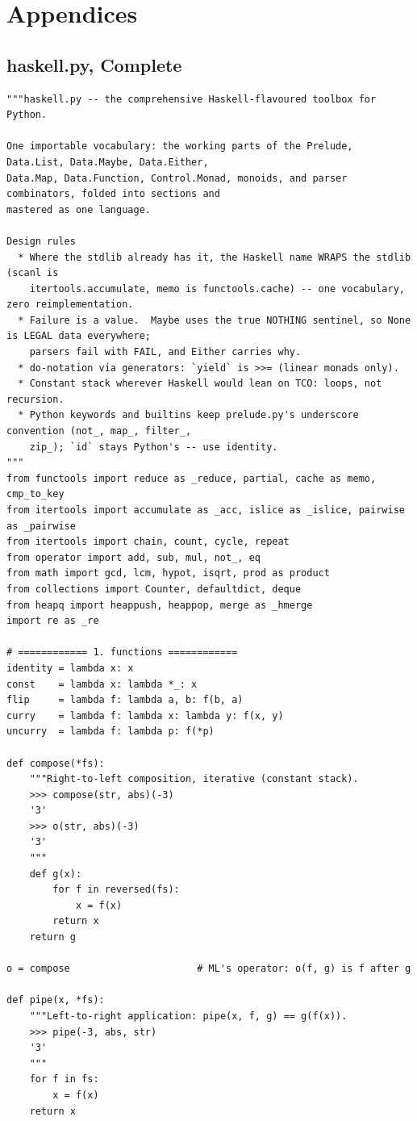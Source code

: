 \documentclass[10pt,letterpaper]{book}
\begin{document}
\part{Appendices}
\chapter{haskell.py, Complete}
\begin{lstlisting}[style=file]
"""haskell.py -- the comprehensive Haskell-flavoured toolbox for Python.

One importable vocabulary: the working parts of the Prelude, Data.List, Data.Maybe, Data.Either,
Data.Map, Data.Function, Control.Monad, monoids, and parser combinators, folded into sections and
mastered as one language.

Design rules
  * Where the stdlib already has it, the Haskell name WRAPS the stdlib (scanl is
    itertools.accumulate, memo is functools.cache) -- one vocabulary, zero reimplementation.
  * Failure is a value.  Maybe uses the true NOTHING sentinel, so None is LEGAL data everywhere;
    parsers fail with FAIL, and Either carries why.
  * do-notation via generators: `yield` is >>= (linear monads only).
  * Constant stack wherever Haskell would lean on TCO: loops, not recursion.
  * Python keywords and builtins keep prelude.py's underscore convention (not_, map_, filter_,
    zip_); `id` stays Python's -- use identity.
"""
from functools import reduce as _reduce, partial, cache as memo, cmp_to_key
from itertools import accumulate as _acc, islice as _islice, pairwise as _pairwise
from itertools import chain, count, cycle, repeat
from operator import add, sub, mul, not_, eq
from math import gcd, lcm, hypot, isqrt, prod as product
from collections import Counter, defaultdict, deque
from heapq import heappush, heappop, merge as _hmerge
import re as _re

# ============ 1. functions ============
identity = lambda x: x
const    = lambda x: lambda *_: x
flip     = lambda f: lambda a, b: f(b, a)
curry    = lambda f: lambda x: lambda y: f(x, y)
uncurry  = lambda f: lambda p: f(*p)

def compose(*fs):
    """Right-to-left composition, iterative (constant stack).
    >>> compose(str, abs)(-3)
    '3'
    >>> o(str, abs)(-3)
    '3'
    """
    def g(x):
        for f in reversed(fs):
            x = f(x)
        return x
    return g

o = compose                      # ML's operator: o(f, g) is f after g

def pipe(x, *fs):
    """Left-to-right application: pipe(x, f, g) == g(f(x)).
    >>> pipe(-3, abs, str)
    '3'
    """
    for f in fs:
        x = f(x)
    return x


\end{lstlisting}
\end{document}
